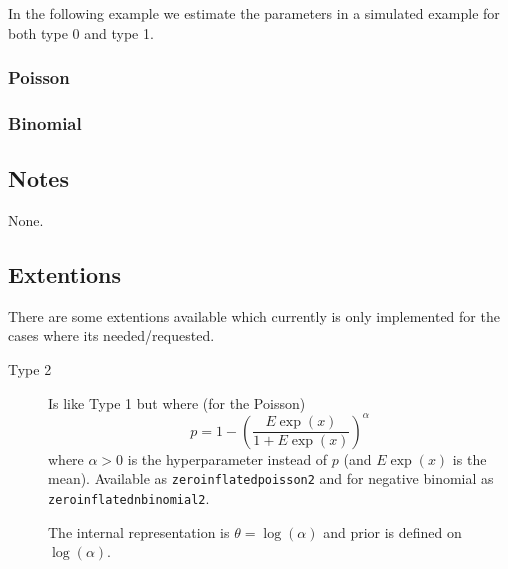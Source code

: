 \documentclass[a4paper,11pt]{article}
\begin{document}
In the following example we estimate the parameters in a simulated
example for both type 0 and type 1.
\subsubsection*{Poisson}



\subsubsection*{Binomial}



\subsection*{Notes}

None.

\subsection*{Extentions}

There are some extentions available which currently is only
implemented for the cases where its needed/requested.
\begin{description}
\item[Type 2] Is like Type 1 but where (for the Poisson)
    \begin{displaymath}
        p = 1-\left( \frac{E\exp(x)}{1 + E\exp(x)}\right)^{\alpha}
    \end{displaymath}
    where $\alpha > 0$ is the hyperparameter instead of $p$ (and
    $E\exp(x)$ is the mean).  Available as
    \texttt{zeroinflatedpoisson2} and for negative binomial as
    \texttt{zeroinflatednbinomial2}.

    The internal representation is $\theta = \log(\alpha)$ and prior
    is defined on $\log(\alpha)$.
\end{description}
\end{document}
